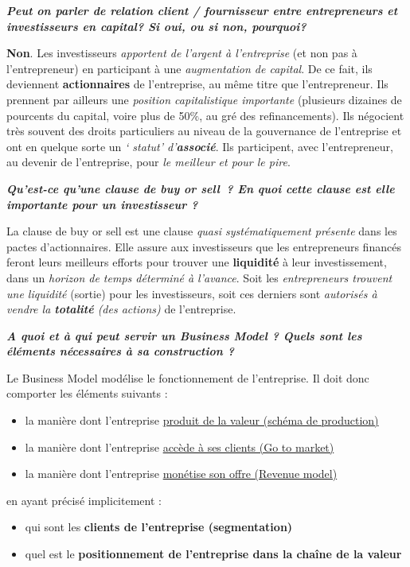 \documentclass[12pt,oneside,a4paper]{article}
\begin{document}
\textbf{\emph{Peut on parler de relation client / fournisseur entre entrepreneurs et investisseurs en capital? Si oui, ou si non, pourquoi?}}

\textbf{Non}. Les investisseurs \emph{apportent de l’argent à l’entreprise} (et non pas à l’entrepreneur) en participant à une \emph{augmentation de capital}. De ce fait, ils deviennent \textbf{actionnaires} de l’entreprise, au même titre que l’entrepreneur. Ils prennent par ailleurs une \emph{position capitalistique importante} (plusieurs dizaines de pourcents du capital, voire plus de 50$ \%$, au gré des refinancements). Ils négocient très souvent des droits particuliers au niveau de la gouvernance de l’entreprise et ont en quelque sorte un\emph{ `	statut' d’\textbf{associé}}. Ils participent, avec l’entrepreneur, au devenir de l’entreprise, pour \emph{le meilleur et pour le pire}.


\textbf{\emph{Qu’est-ce qu’une clause de buy or sell ? En quoi cette clause est elle importante pour un investisseur ?}}

La clause de buy or sell est une clause \emph{quasi systématiquement présente} dans les pactes d’actionnaires. Elle assure aux investisseurs que les entrepreneurs financés feront leurs meilleurs efforts pour trouver une \textbf{liquidité} à leur investissement, dans un \emph{horizon de temps déterminé à l’avance}. Soit les \emph{entrepreneurs trouvent une liquidité} (sortie) pour les investisseurs, soit ces derniers sont \emph{autorisés à vendre la \textbf{totalité} (des actions)} de l’entreprise.

\textbf{\emph{A quoi et à qui peut servir un Business Model ? Quels sont les éléments nécessaires à sa construction ? }}

Le Business Model modélise le fonctionnement de l’entreprise. Il doit donc comporter les éléments suivants :

\begin{itemize}[label=]
\item la manière dont l’entreprise \underline{produit de la valeur (schéma de production)}
\item la manière dont l’entreprise \underline{accède à ses clients (Go to market)}
\item la manière dont l’entreprise \underline{monétise son offre (Revenue model)}
\end{itemize}

en ayant précisé implicitement :

\begin{itemize}[label=]
\item qui sont les \textbf{clients de l’entreprise (segmentation)}
\item quel est le \textbf{positionnement de l’entreprise dans la chaîne de la valeur}
\end{itemize}
\end{document}
